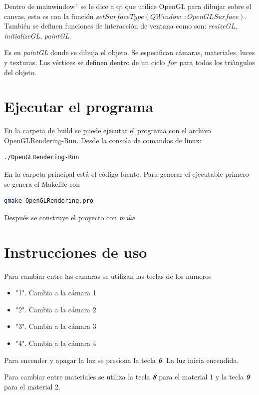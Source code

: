 \documentclass[12pt]{article}
\begin{document}
Dentro de mainwindow´ se le dice a qt que utilice OpenGL para dibujar sobre el canvas, esto es con la función \textit{$setSurfaceType(QWindow::OpenGLSurface)$}. También se definen funciones de interacción de ventana como son: \textit{resizeGL}, \textit{initializeGL}, \textit{paintGL}.

Es en \textit{paintGL} donde se dibuja el objeto. Se especifican cámaras, materiales, luces y texturas. Los vértices se definen dentro de un ciclo $for$ para todos los triàngulos del objeto.




\section{Ejecutar el programa}
En la carpeta de build se puede ejecutar el programa con el archivo OpenGLRendering-Run. Desde la consola de comandos de linux:

\begin{lstlisting}[language=bash,title={bash}]
./OpenGLRendering-Run
\end{lstlisting}


En la carpeta principal está el código fuente. Para generar el ejecutable primero se genera el Makefile con

\begin{lstlisting}[language=bash,title={bash}]
 qmake OpenGLRendering.pro
\end{lstlisting}

Después se construye el proyecto con \textit{make}



\section{Instrucciones de uso}


Para cambiar entre las camaras se utilizan las teclas de los numeros
\begin{itemize}
\item "1". Cambia a la cámara 1
\item "2". Cambia a la cámara 2
\item "3". Cambia a la cámara 3
\item "4". Cambia a la cámara 4

\end{itemize}


Para encender y apagar la luz se presiona la tecla \textbf{\textit{6}}. La luz inicia encendida.


Para cambiar entre materiales se utiliza la tecla \textbf{\textit{8}} para el material 1 y la tecla \textbf{\textit{9}} para el material 2.
\end{document}
